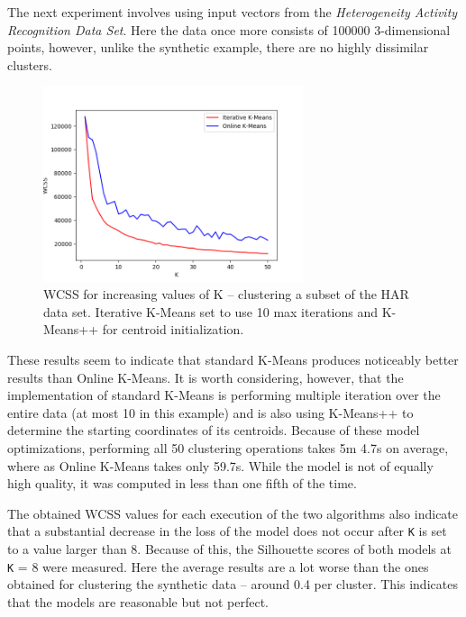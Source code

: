 \documentclass{l4proj}
\begin{document}
The next experiment involves using input vectors from the \textit{Heterogeneity Activity Recognition Data Set}. Here the data once more consists of 100000 3-dimensional points, however, unlike the synthetic example, there are no highly dissimilar clusters. 

\begin{figure}[H]
	\centering
    \label{fig:res2}
    \includegraphics[width=0.68\textwidth]{images/result2}
    \caption{WCSS for increasing values of K -- clustering a subset of the HAR data set. Iterative K-Means set to use 10 max iterations and K-Means++ for centroid initialization. } 
\end{figure}

These results seem to indicate that standard K-Means produces noticeably better results than Online K-Means. It is worth considering, however, that the implementation of standard K-Means is performing multiple iteration over the entire data (at most 10 in this example) and is also using K-Means++ to determine the starting coordinates of its centroids. Because of these model optimizations, performing all 50 clustering operations takes 5m 4.7s on average, where as Online K-Means takes only 59.7s. While the model is not of equally high quality, it was computed in less than one fifth of the time.

The obtained WCSS values for each execution of the two algorithms also indicate that a substantial decrease in the loss of the model does not occur after \texttt{K} is set to a value larger than 8. Because of this, the Silhouette scores of both models at \texttt{K} = 8 were measured. Here the average results are a lot worse than the ones obtained for clustering the synthetic data -- around 0.4 per cluster. This indicates that the models are reasonable but not perfect.
\end{document}
